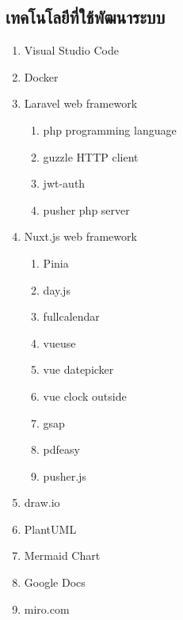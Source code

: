 \subsection{เทคโนโลยีที่ใช้พัฒนาระบบ}

\begin{enumerate}
    \item Visual Studio Code
    \item Docker
    \item Laravel web framework
    \begin{enumerate}
        \item php programming language
        \item guzzle HTTP client
        \item jwt-auth
        \item pusher php server
    \end{enumerate}
    \item Nuxt.js web framework
    \begin{enumerate}
        \item Pinia
        \item day.js
        \item fullcalendar
        \item vueuse
        \item vue datepicker
        \item vue clock outside
        \item gsap
        \item pdfeasy
        \item pusher.js
    \end{enumerate}
    \item draw.io
    \item PlantUML
    \item Mermaid Chart
    \item Google Docs
    \item miro.com
\end{enumerate}
